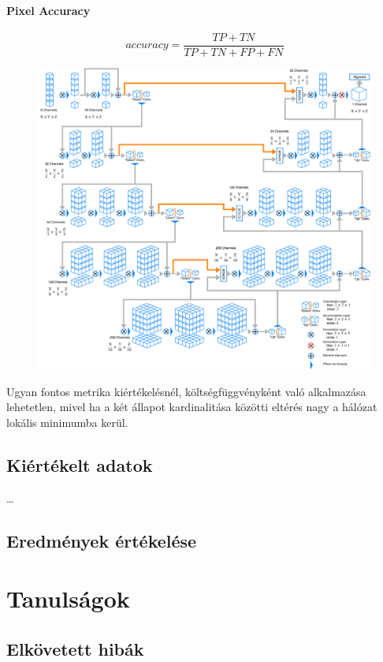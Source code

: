 \documentclass[a4paper]{article}
\begin{document}
	\paragraph{Pixel Accuracy}
		\begin{equation}
	accuracy= \frac{TP+TN}{TP+TN+FP+FN}
	\end{equation}	\begin{figure}
		\centering
		\includegraphics[width=\linewidth]{"VNetDiagram"}
		\caption[A V-Net felépítése]{}
		\label{fig:vnetdiagram}
	\end{figure}
	Ugyan fontos metrika kiértékelésnél, költségfüggvényként való alkalmazása lehetetlen, mivel ha a két állapot kardinalitása közötti eltérés nagy a hálózat lokális minimumba kerül.
	\subsection*{Kiértékelt adatok}
	\dots
	\subsection{Eredmények értékelése}
	\section*{Tanulságok}
	\subsection*{Elkövetett hibák}
\end{document}
